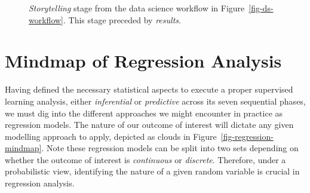 \documentclass[
  letterpaper,
  DIV=11,
  numbers=noendperiod]{scrreprt}
\begin{document}
\begin{figure}


\caption{\label{fig-ds-workflow-storytelling}\emph{Storytelling} stage
from the data science workflow in Figure~\ref{fig-ds-workflow}. This
stage preceded by \emph{results}.}

\end{figure}%

\section{Mindmap of Regression Analysis}\label{sec-regression-mindmap}

Having defined the necessary statistical aspects to execute a proper
supervised learning analysis, either \emph{inferential} or
\emph{predictive} across its seven sequential phases, we must dig into
the different approaches we might encounter in practice as regression
models. The nature of our outcome of interest will dictate any given
modelling approach to apply, depicted as clouds in
Figure~\ref{fig-regression-mindmap}. Note these regression models can be
split into two sets depending on whether the outcome of interest is
\emph{continuous} or \emph{discrete}. Therefore, under a probabilistic
view, identifying the nature of a given random variable is crucial in
regression analysis.
\end{document}
